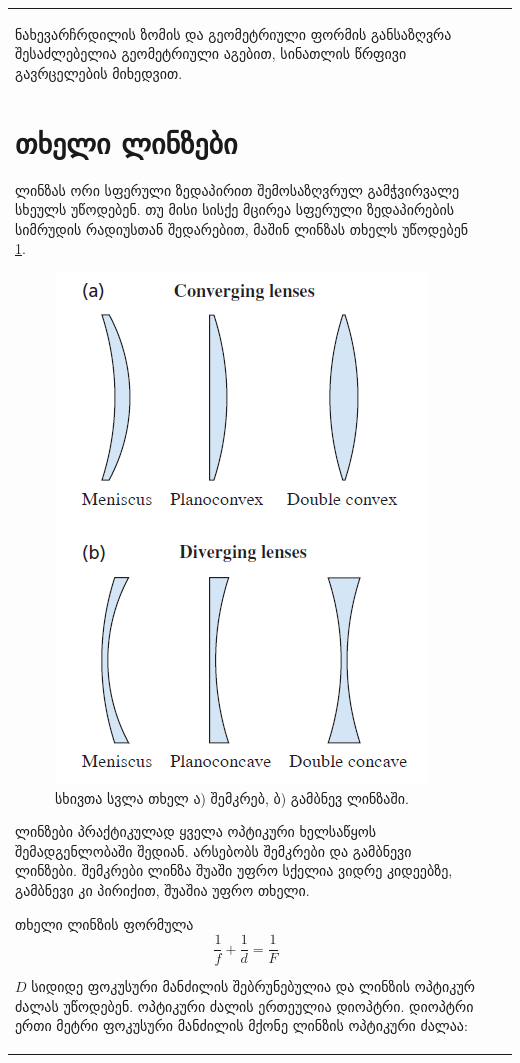 \documentclass{book}
\begin{document}
\begin{tabular}{|l|c|c|}
ნახევარჩრდილის ზომის და გეომეტრიული ფორმის განსაზღვრა შესაძლებელია გეომეტრიული აგებით, სინათლის წრფივი გავრცელების მიხედვით.

\section{თხელი ლინზები} ლინზას ორი სფერული ზედაპირით შემოსაზღვრულ გამჭვირვალე სხეულს უწოდებენ. თუ მისი სისქე მცირეა სფერული ზედაპირების სიმრუდის რადიუსთან შედარებით, მაშინ ლინზას თხელს უწოდებენ \ref{fig:thin_lenses}.
		\begin{figure}[h]
		   \centering
           \includegraphics[width=0.4\columnwidth]{figures/thin_lenses}
           \caption{სხივთა სვლა თხელ ა) შემკრებ, ბ) გამბნევ ლინზაში.}
           \label{fig:thin_lenses}
        \end{figure}


ლინზები პრაქტიკულად ყველა ოპტიკური ხელსაწყოს შემადგენლობაში შედიან. არსებობს შემკრები და გამბნევი ლინზები. შემკრები ლინზა შუაში უფრო სქელია ვიდრე კიდეებზე, გამბნევი კი პირიქით, შუაშია უფრო თხელი.

თხელი ლინზის ფორმულა
	\begin{equation}
		\frac{1}{f} + \frac{1}{d} = \frac{1}{F}
	\end{equation}

$D$ სიდიდე ფოკუსური მანძილის შებრუნებულია და ლინზის ოპტიკურ ძალას უწოდებენ. ოპტიკური ძალის ერთეულია დიოპტრი. დიოპტრი ერთი მეტრი ფოკუსური მანძილის მქონე ლინზის ოპტიკური ძალაა:



\end{tabular}
\end{document}
